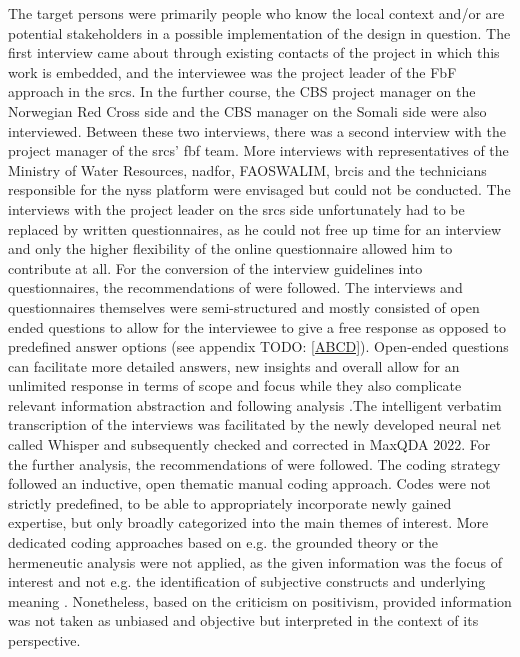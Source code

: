 The target persons were primarily people who know the local context and/or are potential stakeholders in a possible implementation of the design in question. The first interview came about through existing contacts of the project in which this work is embedded, and the interviewee was the project leader of the FbF approach in the \acrshort{srcs}. In the further course, the CBS project manager on the Norwegian Red Cross side and the CBS manager on the Somali side were also interviewed. Between these two interviews, there was a second interview with the project manager of the \acrshort{srcs}' \acrshort{fbf} team. More interviews with representatives of the Ministry of Water Resources, \acrshort{nadfor}, FAOSWALIM, \acrshort{brcis} and the technicians responsible for the \acrshort{nyss} platform were envisaged but could not be conducted. The interviews with the project leader on the \acrshort{srcs} side unfortunately had to be replaced by written questionnaires, as he could not free up time for an interview and only the higher flexibility of the online questionnaire allowed him to contribute at all. For the conversion of the interview guidelines into questionnaires, the recommendations of \autocite{harknessCCSGQuestionnaireDesign2016} were followed. The interviews and questionnaires themselves were semi-structured and mostly consisted of open ended questions to allow for the interviewee to give a free response as opposed to predefined answer options (see appendix TODO: \ref*{ABCD}). Open-ended questions can facilitate more detailed answers, new insights and overall allow for an unlimited response in terms of scope and focus while they also complicate relevant information abstraction and following analysis \autocite{pelzResearchMethodsSocial}.\linebreak[1]
The intelligent verbatim transcription of the interviews was facilitated by the newly developed neural net called Whisper \autocite{openaiIntroducingWhisper2022,openaiWhisper2023} and subsequently checked and corrected in MaxQDA 2022. For the further analysis, the recommendations of \autocite{radikerFocusedAnalysisQualitative2020} were followed. The coding strategy followed an inductive, open thematic manual coding approach. Codes were not strictly predefined, to be able to appropriately incorporate newly gained expertise, but only broadly categorized into the main themes of interest. More dedicated coding approaches based on e.g. the grounded theory or the hermeneutic analysis were not applied, as the given information was the focus of interest and not e.g. the identification of subjective constructs and underlying meaning \autocite{pelzResearchMethodsSocial}. Nonetheless, based on the criticism on positivism, provided information was not taken as unbiased and objective but interpreted in the context of its perspective.

